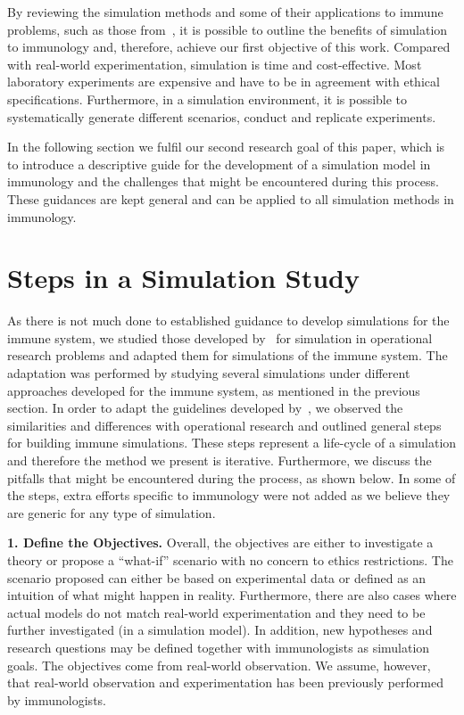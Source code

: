 \documentclass{llncs}
\begin{document}
By reviewing the simulation methods and some of their applications to immune problems, such as those from~\cite{Nuno:2007,Look:1981,Zand:2004,Figge:2005,Thorne:2007}, it is possible to outline the benefits of simulation to immunology and, therefore, achieve our first objective of this work. Compared with real-world experimentation, simulation is time and cost-effective. Most laboratory experiments are expensive and have to be in agreement with ethical specifications. Furthermore, in a simulation environment, it is possible to systematically generate different scenarios, conduct and replicate experiments.

In the following section we fulfil our second research goal of this paper, which is to introduce a descriptive guide for the development of a simulation model in immunology and the challenges that might be encountered during this process. These guidances are kept general and can be applied to all simulation methods in immunology.


\section{Steps in a Simulation Study}
\label{steps}


As there is not much done to established guidance to develop simulations for the immune system, we studied those developed by~\cite{Robinson:2004} for simulation in operational research problems and adapted them for simulations of the immune system. The adaptation was performed by studying several simulations under different approaches developed for the immune system, as mentioned in the previous section. In order to adapt the guidelines developed by~\cite{Robinson:2004}, we  observed the similarities and differences with operational research and outlined general steps for building immune simulations. These steps represent a life-cycle of a simulation and therefore the method we present is iterative. Furthermore, we discuss the pitfalls that might be encountered during the process, as shown below. In some of the steps, extra efforts specific to immunology were not added as we believe they are generic for any type of simulation.

{\bf 1. Define the Objectives.} Overall, the objectives are either to investigate a theory or propose a ``what-if'' scenario with no concern to  ethics restrictions. The scenario proposed can either be based on experimental data or defined as an intuition of what might happen in reality. Furthermore, there are also cases where actual models do not match real-world experimentation and they need to be further investigated (in a simulation model). In addition, new hypotheses and research questions may be defined together with immunologists as simulation goals. The objectives come from real-world observation. We assume, however, that real-world observation and experimentation has been previously performed by immunologists.
\end{document}
